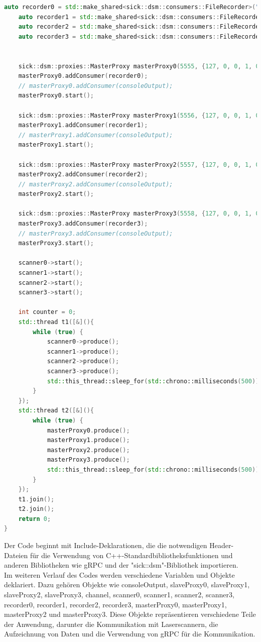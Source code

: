 \begin{lstlisting}[caption=Sample Code Listing C++, label={lst:listing-cpp}, language=C++]
    auto recorder0 = std::make_shared<sick::dsm::consumers::FileRecorder>("recorder0.bin");
    auto recorder1 = std::make_shared<sick::dsm::consumers::FileRecorder>("recorder1.bin");
    auto recorder2 = std::make_shared<sick::dsm::consumers::FileRecorder>("recorder2.bin");
    auto recorder3 = std::make_shared<sick::dsm::consumers::FileRecorder>("recorder3.bin");


    sick::dsm::proxies::MasterProxy masterProxy0(5555, {127, 0, 0, 1, 0x15, 0xb3, 0, 0});
    masterProxy0.addConsumer(recorder0);
    // masterProxy0.addConsumer(consoleOutput);
    masterProxy0.start();

    sick::dsm::proxies::MasterProxy masterProxy1(5556, {127, 0, 0, 1, 0x15, 0xb4, 0, 0});
    masterProxy1.addConsumer(recorder1);
    // masterProxy1.addConsumer(consoleOutput);
    masterProxy1.start();

    sick::dsm::proxies::MasterProxy masterProxy2(5557, {127, 0, 0, 1, 0x15, 0xb5, 0, 0});
    masterProxy2.addConsumer(recorder2);
    // masterProxy2.addConsumer(consoleOutput);
    masterProxy2.start();

    sick::dsm::proxies::MasterProxy masterProxy3(5558, {127, 0, 0, 1, 0x15, 0xb6, 0, 0});
    masterProxy3.addConsumer(recorder3);
    // masterProxy3.addConsumer(consoleOutput);
    masterProxy3.start();

    scanner0->start();
    scanner1->start();
    scanner2->start();
    scanner3->start();

    int counter = 0;
    std::thread t1([&](){
        while (true) {
            scanner0->produce();
            scanner1->produce();
            scanner2->produce();
            scanner3->produce();
            std::this_thread::sleep_for(std::chrono::milliseconds(500));
        }
    });
    std::thread t2([&](){
        while (true) {
            masterProxy0.produce();
            masterProxy1.produce();
            masterProxy2.produce();
            masterProxy3.produce();
            std::this_thread::sleep_for(std::chrono::milliseconds(500));
        }
    });
    t1.join();
    t2.join();
    return 0;
}
\end{lstlisting}
Der Code beginnt mit Include-Deklarationen, die die notwendigen Header-Dateien für die Verwendung von C++-Standardbibliotheksfunktionen und anderen Bibliotheken wie gRPC und der "sick::dsm"-Bibliothek importieren.\\

Im weiteren Verlauf des Codes werden verschiedene Variablen und Objekte deklariert. Dazu gehören Objekte wie consoleOutput, slaveProxy0, slaveProxy1, slaveProxy2, slaveProxy3, channel, scanner0, scanner1, scanner2, scanner3, recorder0, recorder1, recorder2, recorder3, masterProxy0, masterProxy1, masterProxy2 und masterProxy3. Diese Objekte repräsentieren verschiedene Teile der Anwendung, darunter die Kommunikation mit Laserscannern, die Aufzeichnung von Daten und die Verwendung von gRPC für die Kommunikation.\\

